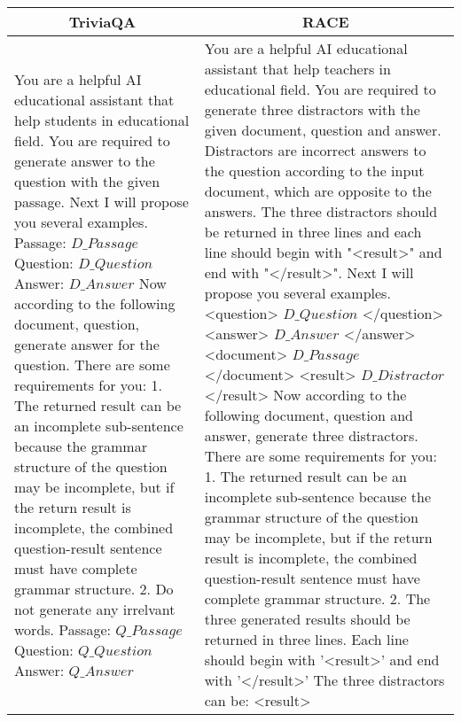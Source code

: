 \begin{table*}[ht]
\vspace{-0.3em}
\centering
\footnotesize
\begin{tabularx}{\textwidth}{X|X}
\hline
\multicolumn{1}{c|}{TriviaQA} & \multicolumn{1}{c}{RACE} \\
\hline
You are a helpful AI educational assistant that help students in educational field. You are required to generate answer to the question with the given passage. Next I will propose you several examples. \newline
Passage: $D\_ Passage$ \newline
Question: $D\_Question$ \newline
Answer: $D\_Answer$ \newline
Now according to the following document, question, generate answer for the question.
There are some requirements for you: 1. The returned result can be an incomplete sub-sentence because the grammar structure of the question may be incomplete, but if the return result is incomplete, the combined question-result sentence must have complete grammar structure. 2. Do not generate any irrelvant words. \newline
Passage: $Q\_Passage$ \newline
Question: $Q\_ Question$ \newline
Answer: $Q\_Answer$ &
You are a helpful AI educational assistant that help teachers in educational field. You are required to generate three distractors with the given document, question and answer. Distractors are incorrect answers to the question according to the input document, which are opposite to the answers. The three distractors should be returned in three lines and each line should begin with "<result>" and end with "</result>". Next I will propose you several examples.\newline
<question> $D\_Question$ </question> \newline
<answer> $D\_Answer$ </answer> \newline
<document> $D\_Passage$ </document> \newline
<result> $D\_Distractor$ </result> \newline
Now according to the following document, question and answer, generate three distractors. There are some requirements for you: 1. The returned result can be an incomplete sub-sentence because the grammar structure of the question may be incomplete, but if the return result is incomplete, the combined question-result sentence must have complete grammar structure. 2. The three generated results should be returned in three lines. Each line should begin with '<result>' and end with '</result>' The three distractors can be: <result>\newline

\end{tabularx}
\end{table*}
